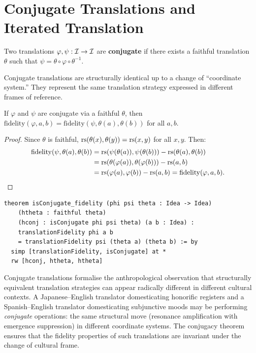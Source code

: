 \section{Conjugate Translations and Iterated Translation}
\label{sec:translation:conjugate}

\begin{definition}
\label{def:conjugate}
Two translations $\varphi, \psi : \mathcal{I} \to \mathcal{I}$ are \textbf{conjugate}
if there exists a faithful translation $\theta$ such that
$\psi = \theta \circ \varphi \circ \theta^{-1}$.
\end{definition}

Conjugate translations are structurally identical up to a change of
``coordinate system.''  They represent the same translation strategy
expressed in different frames of reference.

\begin{theorem}
\label{thm:conjugate-fidelity}
If $\varphi$ and $\psi$ are conjugate via a faithful $\theta$, then
$\mathrm{fidelity}(\varphi, a, b) =
 \mathrm{fidelity}(\psi, \theta(a), \theta(b))$
for all $a, b$.
\end{theorem}

\begin{proof}
Since $\theta$ is faithful, $\mathrm{rs}(\theta(x), \theta(y)) = \mathrm{rs}(x, y)$ for
all $x, y$.  Then:
\begin{align*}
  \mathrm{fidelity}(\psi, \theta(a), \theta(b))
    &= \mathrm{rs}(\psi(\theta(a)), \psi(\theta(b))) - \mathrm{rs}(\theta(a), \theta(b)) \\
    &= \mathrm{rs}(\theta(\varphi(a)), \theta(\varphi(b))) - \mathrm{rs}(a, b) \\
    &= \mathrm{rs}(\varphi(a), \varphi(b)) - \mathrm{rs}(a, b)
     = \mathrm{fidelity}(\varphi, a, b).
\end{align*}
\end{proof}

\begin{lstlisting}
theorem isConjugate_fidelity (phi psi theta : Idea -> Idea)
    (htheta : faithful theta)
    (hconj : isConjugate phi psi theta) (a b : Idea) :
    translationFidelity phi a b
    = translationFidelity psi (theta a) (theta b) := by
  simp [translationFidelity, isConjugate] at *
  rw [hconj, htheta, htheta]
\end{lstlisting}

\begin{interpretation}
\label{int:conjugate-cultural}
Conjugate translations formalise the anthropological observation that
structurally equivalent translation strategies can appear radically different
in different cultural contexts.  A Japanese--English translator domesticating
honorific registers and a Spanish--English translator domesticating
subjunctive moods may be performing \emph{conjugate} operations: the same
structural move (resonance amplification with emergence suppression) in
different coordinate systems.  The conjugacy theorem ensures that the
fidelity properties of such translations are invariant under the change
of cultural frame.
\end{interpretation}

